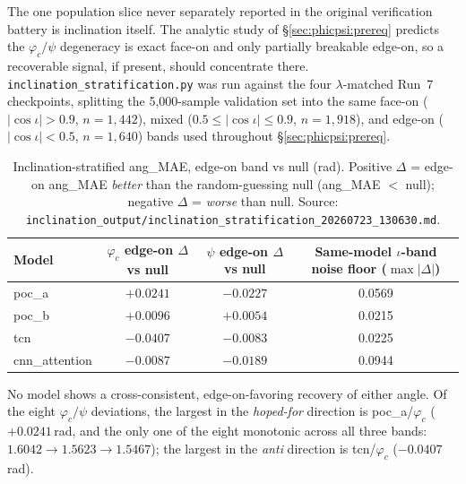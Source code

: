 \documentclass[11pt]{article}
\begin{document}
The one population slice never separately reported in the original verification battery is inclination itself.
The analytic study of \S\ref{sec:phicpsi:prereq} predicts the $\varphi_c/\psi$ degeneracy is exact face-on and only partially breakable edge-on, so a recoverable signal, if present, should concentrate there.
\texttt{inclination\_stratification.py} was run against the four $\lambda$-matched Run~7 checkpoints, splitting the 5{,}000-sample validation set into the same face-on ($|\cos\iota| > 0.9$, $n=1{,}442$), mixed ($0.5 \le |\cos\iota| \le 0.9$, $n=1{,}918$), and edge-on ($|\cos\iota| < 0.5$, $n=1{,}640$) bands used throughout \S\ref{sec:phicpsi:prereq}.

\begin{table}[tbp]
    \centering
    \caption{Inclination-stratified ang\_MAE, edge-on band vs null (rad). Positive $\Delta$ = edge-on ang\_MAE \emph{better} than the random-guessing null (ang\_MAE $<$ null); negative $\Delta$ = \emph{worse} than null.
    Source: \texttt{inclination\_output/inclination\_stratification\_20260723\_130630.md}.}
    \label{tab:phicpsi:inclination}
    \small
    \begin{tabular}{@{}lccc@{}}
        \toprule
        Model & $\varphi_c$ edge-on $\Delta$ vs null & $\psi$ edge-on $\Delta$ vs null & Same-model $\iota$-band noise floor ($\max|\Delta|$) \\
        \midrule
        poc\_a         & $+0.0241$ & $-0.0227$ & 0.0569 \\
        poc\_b         & $+0.0096$ & $+0.0054$ & 0.0215 \\
        tcn            & $-0.0407$ & $-0.0083$ & 0.0225 \\
        cnn\_attention & $-0.0087$ & $-0.0189$ & 0.0944 \\
        \bottomrule
    \end{tabular}
\end{table}

No model shows a cross-consistent, edge-on-favoring recovery of either angle.
Of the eight $\varphi_c/\psi$ deviations, the largest in the \emph{hoped-for} direction is poc\_a/$\varphi_c$ ($+0.0241$\,rad, and the only one of the eight monotonic across all three bands: $1.6042 \to 1.5623 \to 1.5467$); the largest in the \emph{anti} direction is tcn/$\varphi_c$ ($-0.0407$\,rad).
\end{document}
